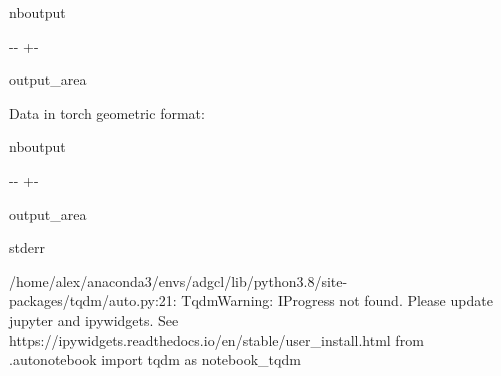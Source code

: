 \documentclass[letterpaper,10pt,english]{sphinxhowto}
\begin{document}
\begin{sphinxuseclass}{nboutput}
{

\kern-\sphinxverbatimsmallskipamount\kern-\baselineskip
\kern+\FrameHeightAdjust\kern-\fboxrule
\vspace{\nbsphinxcodecellspacing}

\begin{sphinxuseclass}{output_area}
\begin{sphinxuseclass}{}


\begin{sphinxVerbatim}[commandchars=\\\{\}]
Data in torch geometric format:
\end{sphinxVerbatim}



\end{sphinxuseclass}
\end{sphinxuseclass}
}

\end{sphinxuseclass}
\begin{sphinxuseclass}{nboutput}
{

\kern-\sphinxverbatimsmallskipamount\kern-\baselineskip
\kern+\FrameHeightAdjust\kern-\fboxrule
\vspace{\nbsphinxcodecellspacing}

\begin{sphinxuseclass}{output_area}
\begin{sphinxuseclass}{stderr}


\begin{sphinxVerbatim}[commandchars=\\\{\}]
/home/alex/anaconda3/envs/adgcl/lib/python3.8/site-packages/tqdm/auto.py:21: TqdmWarning: IProgress not found. Please update jupyter and ipywidgets. See https://ipywidgets.readthedocs.io/en/stable/user\_install.html
  from .autonotebook import tqdm as notebook\_tqdm
\end{sphinxVerbatim}



\end{sphinxuseclass}
\end{sphinxuseclass}
}

\end{sphinxuseclass}
\end{document}
